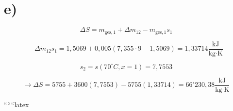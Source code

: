

\section*{e)}

\begin{equation*}
\Delta S = m_{\text{ges},1} + \Delta m_{12} - m_{\text{ges},1} s_1
\end{equation*}

\begin{equation*}
- \Delta \dot{m}_{12} s_1 = 1,5069 + 0,005 (7,355 \cdot 9 - 1,5069) = 1,33714 \frac{\text{kJ}}{\text{kg} \cdot \text{K}}
\end{equation*}

\begin{equation*}
s_2 = s(70^\circ C, x=1) = 7,7553
\end{equation*}

\begin{equation*}
\rightarrow \Delta S = 5755 + 3600 (7,7553) - 5755 (1,33714) = 66'230,38 \frac{\text{kJ}}{\text{kg} \cdot \text{K}}
\end{equation*}

``````latex